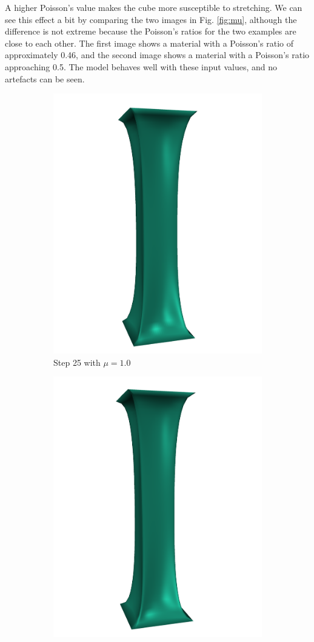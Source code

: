 A higher Poisson's value makes the cube more susceptible to stretching. We can see this effect a bit by comparing the two images in Fig. \ref{fig:mu}, although the difference is not extreme because the Poisson's ratios for the two examples are close to each other. The first image shows a material with a Poisson's ratio of approximately 0.46, and the second image shows a material with a Poisson's ratio approaching 0.5. The model behaves well with these input values, and no artefacts can be seen.
\begin{figure}[!ht]
\centering
\begin{subfigure}{.47\textwidth}
  \centering
  \includegraphics[width=.75\linewidth]{resources/mu_res_new.png}  
  \caption{Step 25 with $\mu = 1.0$}
  \label{fig:mu_1}
\end{subfigure}
\begin{subfigure}{.47\textwidth}
  \centering
  \includegraphics[width=.75\linewidth]{resources/mu_mu_new.png}  

\end{subfigure}
\end{figure}
